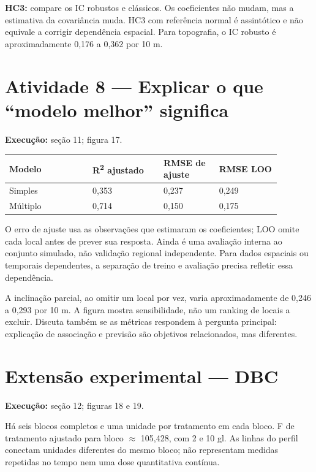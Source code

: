 \textbf{HC3:} compare os IC robustos e clássicos. Os coeficientes não mudam, mas a estimativa da covariância muda. HC3 com referência normal é assintótico e não equivale a corrigir dependência espacial. Para topografia, o IC robusto é aproximadamente 0,176 a 0,362 por 10 m.

\section{Atividade 8 --- Explicar o que “modelo melhor” significa}

\textbf{Execução:} seção 11; figura 17.

\begin{table}[H]\centering\small
\begin{tabular}{p{0.27\linewidth}p{0.23\linewidth}p{0.18\linewidth}p{0.2\linewidth}}
\toprule
Modelo & R\textsuperscript{2} ajustado & RMSE de ajuste & RMSE LOO\\
\midrule
Simples & 0,353 & 0,237 & 0,249\\
Múltiplo & 0,714 & 0,150 & 0,175\\
\bottomrule\end{tabular}\end{table}

O erro de ajuste usa as observações que estimaram os coeficientes; LOO omite cada local antes de prever sua resposta. Ainda é uma avaliação interna ao conjunto simulado, não validação regional independente. Para dados espaciais ou temporais dependentes, a separação de treino e avaliação precisa refletir essa dependência.

A inclinação parcial, ao omitir um local por vez, varia aproximadamente de 0,246 a 0,293 por 10 m. A figura mostra sensibilidade, não um ranking de locais a excluir. Discuta também se as métricas respondem à pergunta principal: explicação de associação e previsão são objetivos relacionados, mas diferentes.

\section{Extensão experimental --- DBC}

\textbf{Execução:} seção 12; figuras 18 e 19.

Há seis blocos completos e uma unidade por tratamento em cada bloco. F de tratamento ajustado para bloco \ensuremath{\approx} 105,428, com 2 e 10 gl. As linhas do perfil conectam unidades diferentes do mesmo bloco; não representam medidas repetidas no tempo nem uma dose quantitativa contínua.

